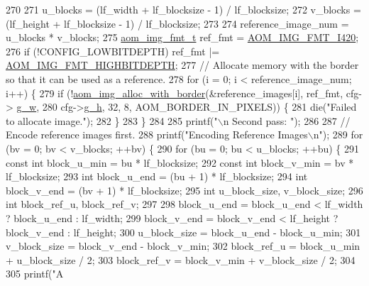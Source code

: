 \begin{DoxyCodeInclude}
{{{{{270 
271   u\_blocks = (lf\_width + lf\_blocksize - 1) / lf\_blocksize;
272   v\_blocks = (lf\_height + lf\_blocksize - 1) / lf\_blocksize;
273 
274   reference\_image\_num = u\_blocks * v\_blocks;
275   \hyperlink{aom__image_8h_ab71efff8c7f49380fad23b93bc2e9bfc}{aom\_img\_fmt\_t} ref\_fmt = \hyperlink{aom__image_8h_a930317c04b4bd0a660bb5e744055523cabd778a3d697463e89d12a1117f417b60}{AOM\_IMG\_FMT\_I420};
276   \textcolor{keywordflow}{if} (!CONFIG\_LOWBITDEPTH) ref\_fmt |= \hyperlink{aom__image_8h_a607b37d91f75442f54223ecd85f1b6cb}{AOM\_IMG\_FMT\_HIGHBITDEPTH};
277   \textcolor{comment}{// Allocate memory with the border so that it can be used as a reference.}
278   \textcolor{keywordflow}{for} (i = 0; i < reference\_image\_num; i++) \{
279     \textcolor{keywordflow}{if} (!\hyperlink{aom__image_8h_aeb211e5184687f7e10d7c5bed4dcfdcd}{aom\_img\_alloc\_with\_border}(&reference\_images[i], ref\_fmt, cfg->
      \hyperlink{structaom__codec__enc__cfg_a80cb459c5ef3c7e1516f617c4c9d6eab}{g\_w},
280                                    cfg->\hyperlink{structaom__codec__enc__cfg_a37b0f57b63bec8d133df8901d4407ee6}{g\_h}, 32, 8, AOM\_BORDER\_IN\_PIXELS)) \{
281       die(\textcolor{stringliteral}{"Failed to allocate image."});
282     \}
283   \}
284 
285   printf(\textcolor{stringliteral}{"\(\backslash\)n Second pass: "});
286 
287   \textcolor{comment}{// Encode reference images first.}
288   printf(\textcolor{stringliteral}{"Encoding Reference Images\(\backslash\)n"});
289   \textcolor{keywordflow}{for} (bv = 0; bv < v\_blocks; ++bv) \{
290     \textcolor{keywordflow}{for} (bu = 0; bu < u\_blocks; ++bu) \{
291       \textcolor{keyword}{const} \textcolor{keywordtype}{int} block\_u\_min = bu * lf\_blocksize;
292       \textcolor{keyword}{const} \textcolor{keywordtype}{int} block\_v\_min = bv * lf\_blocksize;
293       \textcolor{keywordtype}{int} block\_u\_end = (bu + 1) * lf\_blocksize;
294       \textcolor{keywordtype}{int} block\_v\_end = (bv + 1) * lf\_blocksize;
295       \textcolor{keywordtype}{int} u\_block\_size, v\_block\_size;
296       \textcolor{keywordtype}{int} block\_ref\_u, block\_ref\_v;
297 
298       block\_u\_end = block\_u\_end < lf\_width ? block\_u\_end : lf\_width;
299       block\_v\_end = block\_v\_end < lf\_height ? block\_v\_end : lf\_height;
300       u\_block\_size = block\_u\_end - block\_u\_min;
301       v\_block\_size = block\_v\_end - block\_v\_min;
302       block\_ref\_u = block\_u\_min + u\_block\_size / 2;
303       block\_ref\_v = block\_v\_min + v\_block\_size / 2;
304 
305       printf(\textcolor{stringliteral}{"A%
}}}}}}
\end{DoxyCodeInclude}
